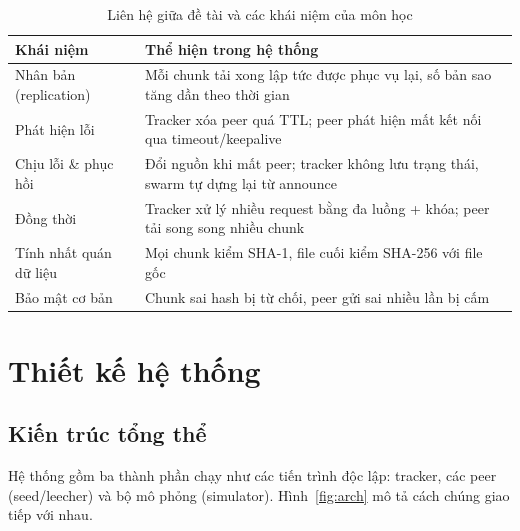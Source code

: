\documentclass[12pt,a4paper,oneside]{report}
\begin{document}
\begin{table}[H]
\centering
\caption{Liên hệ giữa đề tài và các khái niệm của môn học}
\begin{tabularx}{\textwidth}{@{}p{4cm}L@{}}
\toprule
\textbf{Khái niệm} & \textbf{Thể hiện trong hệ thống}\\\midrule
Nhân bản (replication) & Mỗi chunk tải xong lập tức được phục vụ lại, số bản sao tăng dần theo thời gian\\
Phát hiện lỗi & Tracker xóa peer quá TTL; peer phát hiện mất kết nối qua timeout/keepalive\\
Chịu lỗi \& phục hồi & Đổi nguồn khi mất peer; tracker không lưu trạng thái, swarm tự dựng lại từ announce\\
Đồng thời & Tracker xử lý nhiều request bằng đa luồng + khóa; peer tải song song nhiều chunk\\
Tính nhất quán dữ liệu & Mọi chunk kiểm SHA-1, file cuối kiểm SHA-256 với file gốc\\
Bảo mật cơ bản & Chunk sai hash bị từ chối, peer gửi sai nhiều lần bị cấm\\
\bottomrule
\end{tabularx}
\end{table}

\chapter{Thiết kế hệ thống}

\section{Kiến trúc tổng thể}

Hệ thống gồm ba thành phần chạy như các tiến trình độc lập: tracker, các peer (seed/leecher) và bộ mô phỏng (simulator). Hình~\ref{fig:arch} mô tả cách chúng giao tiếp với nhau.
\end{document}
